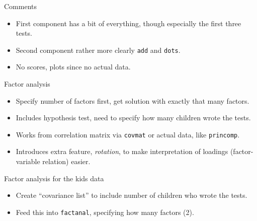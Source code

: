 \documentclass[ignorenonframetext,]{beamer}
\newenvironment{Shaded}{\begin{snugshade}}{\end{snugshade}}
\newcommand{\DataTypeTok}[1]{\textcolor[rgb]{0.13,0.29,0.53}{#1}}
\newcommand{\DecValTok}[1]{\textcolor[rgb]{0.00,0.00,0.81}{#1}}
\newcommand{\KeywordTok}[1]{\textcolor[rgb]{0.13,0.29,0.53}{\textbf{#1}}}
\newcommand{\NormalTok}[1]{#1}
\newcommand{\OperatorTok}[1]{\textcolor[rgb]{0.81,0.36,0.00}{\textbf{#1}}}
\newcommand{\StringTok}[1]{\textcolor[rgb]{0.31,0.60,0.02}{#1}}
\begin{document}
\begin{frame}[fragile]{Comments}
\protect\hypertarget{comments-36}{}

\begin{itemize}
\item
  First component has a bit of everything, though especially the first
  three tests.
\item
  Second component rather more clearly \texttt{add} and \texttt{dots}.
\item
  No scores, plots since no actual data.
\end{itemize}

\end{frame}

\begin{frame}[fragile]{Factor analysis}
\protect\hypertarget{factor-analysis}{}

\begin{itemize}
\item
  Specify number of factors first, get solution with exactly that many
  factors.
\item
  Includes hypothesis test, need to specify how many children wrote the
  tests.
\item
  Works from correlation matrix via \texttt{covmat} or actual data, like
  \texttt{princomp}.
\item
  Introduces extra feature, \emph{rotation}, to make interpretation of
  loadings (factor-variable relation) easier.
\end{itemize}

\end{frame}

\begin{frame}[fragile]{Factor analysis for the kids data}
\protect\hypertarget{factor-analysis-for-the-kids-data}{}

\begin{itemize}
\item
  Create ``covariance list'' to include number of children who wrote the
  tests.
\item
  Feed this into \texttt{factanal}, specifying how many factors (2).
\end{itemize}

\begin{Shaded}
\end{Shaded}

\end{frame}
\end{document}
